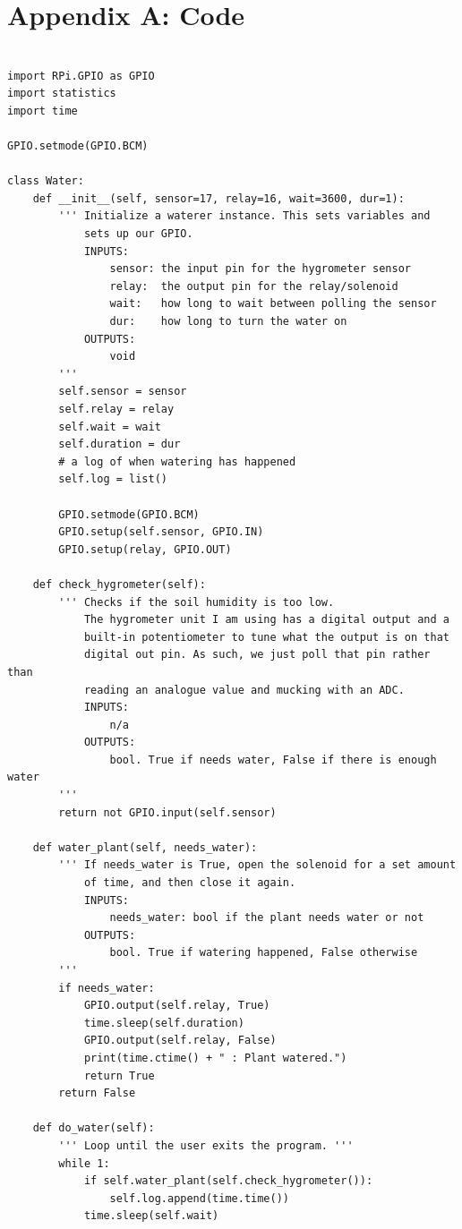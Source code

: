 \documentclass[11pt] {article}
\begin{document}
\newpage
\section*{Appendix A: Code}
\begin{lstlisting}

import RPi.GPIO as GPIO
import statistics
import time

GPIO.setmode(GPIO.BCM)

class Water:
    def __init__(self, sensor=17, relay=16, wait=3600, dur=1):
        ''' Initialize a waterer instance. This sets variables and
            sets up our GPIO.
            INPUTS:
                sensor: the input pin for the hygrometer sensor
                relay:  the output pin for the relay/solenoid
                wait:   how long to wait between polling the sensor
                dur:    how long to turn the water on
            OUTPUTS:
                void
        '''
        self.sensor = sensor
        self.relay = relay
        self.wait = wait
        self.duration = dur
        # a log of when watering has happened
        self.log = list()

        GPIO.setmode(GPIO.BCM)
        GPIO.setup(self.sensor, GPIO.IN)
        GPIO.setup(relay, GPIO.OUT)

    def check_hygrometer(self):
        ''' Checks if the soil humidity is too low.
            The hygrometer unit I am using has a digital output and a
            built-in potentiometer to tune what the output is on that
            digital out pin. As such, we just poll that pin rather than
            reading an analogue value and mucking with an ADC.
            INPUTS:
                n/a
            OUTPUTS:
                bool. True if needs water, False if there is enough water
        '''
        return not GPIO.input(self.sensor)

    def water_plant(self, needs_water):
        ''' If needs_water is True, open the solenoid for a set amount
            of time, and then close it again.
            INPUTS:
                needs_water: bool if the plant needs water or not
            OUTPUTS:
                bool. True if watering happened, False otherwise
        '''
        if needs_water:
            GPIO.output(self.relay, True)
            time.sleep(self.duration)
            GPIO.output(self.relay, False)
            print(time.ctime() + " : Plant watered.")
            return True
        return False

    def do_water(self):
        ''' Loop until the user exits the program. '''
        while 1:
            if self.water_plant(self.check_hygrometer()):
                self.log.append(time.time())
            time.sleep(self.wait)


\end{lstlisting}
\end{document}
